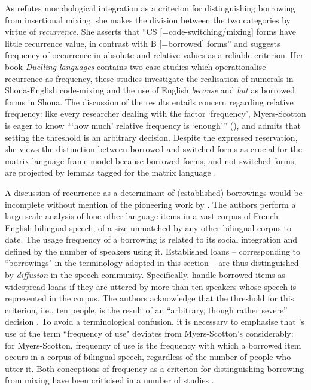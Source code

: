 As \citet{myers-scotton-duelling-1993} refutes morphological integration as a criterion for distinguishing borrowing from insertional mixing, she makes the division between the two categories by virtue of \textit{recurrence}.
She asserts that ``CS [=code-switching/mixing] forms have little recurrence value, in contrast with B [=borrowed] forms'' \citep[163]{myers-scotton-duelling-1993} and suggests frequency of occurrence in absolute and relative values as a reliable criterion. Her book \textit{Duelling languages} contains two case studies which operationalise recurrence as frequency, these studies investigate the realisation of numerals in Shona-English code-mixing and the use of English \textit{because} and \textit{but} as borrowed forms in Shona. The discussion of the results entails concern regarding relative frequency: like every researcher dealing with the factor `frequency', Myers-Scotton is eager to know ```how much' relative frequency is {`enough'}{''} (\citeyear[204]{myers-scotton-duelling-1993}), and admits that setting the threshold is an arbitrary decision. Despite the expressed reservation, she views the distinction between borrowed and switched forms  as crucial for the matrix language frame model because borrowed forms, and not switched forms, are projected by lemmas tagged for the matrix language \citep[41]{myers-scotton-contact-2002}. 

A discussion of recurrence as a determinant of (established) borrowings would be incomplete without mention of the pioneering work by \citet{poplack-etal-1988}. The authors perform a large-scale analysis of lone other-language items in a vast corpus of French-English bilingual speech, of a size unmatched by any other bilingual corpus to date. The usage frequency of a borrowing is related to its social integration and defined by the number of speakers using it. Established loans -- corresponding to ``borrowings" in the terminology adopted in this section -- are thus distinguished by \textit{diffusion} in the speech community. Specifically, \citet[55]{poplack-etal-1988} handle borrowed items as widespread loans if they are uttered by more than ten speakers whose speech is represented in the corpus. The authors acknowledge that the threshold for this criterion, i.e., ten people, is the result of an ``arbitrary, though rather severe'' decision \citep[100]{poplack-etal-1988}. To avoid a terminological confusion, it is necessary to emphasise that \citeauthor[]{poplack-etal-1988}'s use of the term ``frequency of use" deviates from Myers-Scotton's considerably: for Myers-Scotton, frequency of use is the frequency with which a borrowed item occurs in a corpus of bilingual speech, regardless of the number of people who utter it. Both conceptions of frequency as a criterion for distinguishing borrowing from mixing have been criticised in a number of studies \citep[e.g.,][]{haust-codeswitching-1995, boumans-syntax-1998,muhamedowa-untersuchung-2006, stammers-deuchar-2012}.

